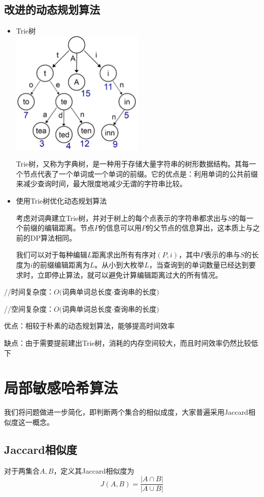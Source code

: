 \documentclass{article}
\begin{document}
		\subsection{改进的动态规划算法}
		\begin{itemize}
		\item Trie树\\
		\includegraphics[width=0.5\textwidth]{svg}
		\par Trie树，又称为字典树，是一种用于存储大量字符串的树形数据结构。其每一个节点代表了一个单词或一个单词的前缀。它的优点是：利用单词的公共前缀来减少查询时间，最大限度地减少无谓的字符串比较。
		\item 使用Trie树优化动态规划算法
		\par 考虑对词典建立Trie树，并对于树上的每个点表示的字符串都求出与$S$的每一个前缀的编辑距离。节点$P$的信息可以用$P$的父节点的信息算出，这本质上与之前的DP算法相同。
		\par 我们可以对于每种编辑$L$距离求出所有有序对$(P,i)$，其中$P$表示的串与$S$的长度为$i$的前缀编辑距离为$L$。从小到大枚举$L$，当查询到的单词数量已经达到要求时，立即停止算法，就可以避免计算编辑距离过大的所有情况。
		\end{itemize}
		\par //时间复杂度：$O($词典单词总长度$\cdot$查询串的长度$)$
		\par //空间复杂度：$O($词典单词总长度$\cdot$查询串的长度$)$
		\par 优点：相较于朴素的动态规划算法，能够提高时间效率
		\par 缺点：由于需要提前建出Trie树，消耗的内存空间较大，而且时间效率仍然比较低下
	\section{局部敏感哈希算法}
	我们将问题做进一步简化，即判断两个集合的相似成度，大家普遍采用Jaccard相似度这一概念。
	\subsection{Jaccard相似度}
	对于两集合$A,B$，定义其Jaccard相似度为$$ J(A,B)=\frac{|A \cap B|}{|A \cup B|}$$
\end{document}
